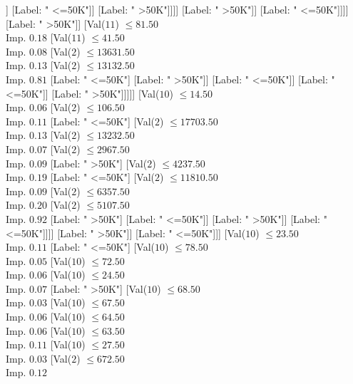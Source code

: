 \documentclass[margin=10pt]{standalone}
\begin{document}
\begin{forest}
															[Label: " <=50K"]
															[Label: " >50K"]]
														[Label: " <=50K"]]
													[Label: " >50K"]]]]
										[Label: " >50K"]]
									[Label: " <=50K"]]]]
						[Label: " >50K"]]
					[Val($11$) $ \leq 81.50$ \\ Imp. $0.18$
						[Val($11$) $ \leq 41.50$ \\ Imp. $0.08$
							[Val($2$) $ \leq 13631.50$ \\ Imp. $0.13$
								[Val($2$) $ \leq 13132.50$ \\ Imp. $0.81$
									[Label: " <=50K"]
									[Label: " >50K"]]
								[Label: " <=50K"]]
							[Label: " <=50K"]]
						[Label: " >50K"]]]]]
		[Val($10$) $ \leq 14.50$ \\ Imp. $0.06$
			[Val($2$) $ \leq 106.50$ \\ Imp. $0.11$
				[Label: " <=50K"]
				[Val($2$) $ \leq 17703.50$ \\ Imp. $0.13$
					[Val($2$) $ \leq 13232.50$ \\ Imp. $0.07$
						[Val($2$) $ \leq 2967.50$ \\ Imp. $0.09$
							[Label: " >50K"]
							[Val($2$) $ \leq 4237.50$ \\ Imp. $0.19$
								[Label: " <=50K"]
								[Val($2$) $ \leq 11810.50$ \\ Imp. $0.09$
									[Val($2$) $ \leq 6357.50$ \\ Imp. $0.20$
										[Val($2$) $ \leq 5107.50$ \\ Imp. $0.92$
											[Label: " >50K"]
											[Label: " <=50K"]]
										[Label: " >50K"]]
									[Label: " <=50K"]]]]
						[Label: " >50K"]]
					[Label: " <=50K"]]]
			[Val($10$) $ \leq 23.50$ \\ Imp. $0.11$
				[Label: " <=50K"]
				[Val($10$) $ \leq 78.50$ \\ Imp. $0.05$
					[Val($10$) $ \leq 72.50$ \\ Imp. $0.06$
						[Val($10$) $ \leq 24.50$ \\ Imp. $0.07$
							[Label: " >50K"]
							[Val($10$) $ \leq 68.50$ \\ Imp. $0.03$
								[Val($10$) $ \leq 67.50$ \\ Imp. $0.06$
									[Val($10$) $ \leq 64.50$ \\ Imp. $0.06$
										[Val($10$) $ \leq 63.50$ \\ Imp. $0.11$
											[Val($10$) $ \leq 27.50$ \\ Imp. $0.03$
												[Val($2$) $ \leq 672.50$ \\ Imp. $0.12$

\end{forest}
\end{document}
